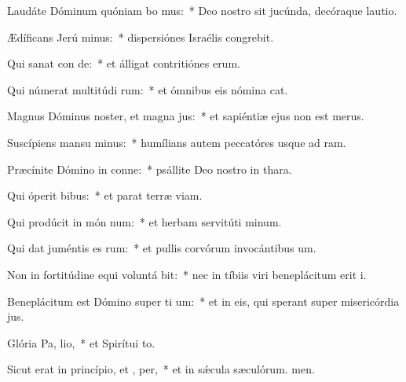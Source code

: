 \item Laudáte Dóminum quóniam bo  mus:~* Deo nostro sit jucúnda, decóraque lautio.
\item Ædíficans Jerú minus:~* dispersiónes Israélis congrebit.
\item Qui sanat con de:~* et álligat contritiónes erum.
\item Qui númerat multitúdi rum:~* et ómnibus eis nómina cat.
\item Magnus Dóminus noster, et magna  jus:~* et sapiéntiæ ejus non est merus.
\item Suscípiens mansu minus:~* humílians autem peccatóres usque ad ram.
\item Præcínite Dómino in conne:~* psállite Deo nostro in thara.
\item Qui óperit  bibus:~* et parat terræ viam.
\item Qui prodúcit in món num:~* et herbam servitúti minum.
\item Qui dat juméntis es rum:~* et pullis corvórum invocántibus um.
\item Non in fortitúdine equi voluntá bit:~* nec in tíbiis viri beneplácitum erit i.
\item Beneplácitum est Dómino super ti um:~* et in eis, qui sperant super misericórdia jus.
\item Glória Pa,  lio,~* et Spirítui to.
\item Sicut erat in princípio, et ,  per,~* et in sǽcula sæculórum. men.
